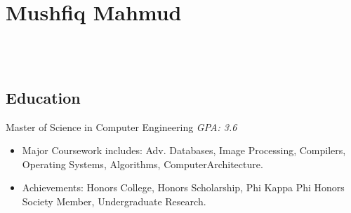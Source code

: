 \documentclass[]{resume}
\begin{document}
\sffamily

\section{Mushfiq Mahmud}

\center
{}
\address{Tampa, FL}
 \\

 \\

\subsection{Education}
Master of Science in Computer Engineering \hfill \emph{GPA: 3.6}

\begin{itemize}
\item Major Coursework includes: Adv. Databases, Image Processing, Compilers, Operating Systems, Algorithms, ComputerArchitecture.
\item Achievements: Honors College, Honors Scholarship, Phi Kappa Phi Honors Society Member, Undergraduate Research.
\end{itemize}
\end{document}
